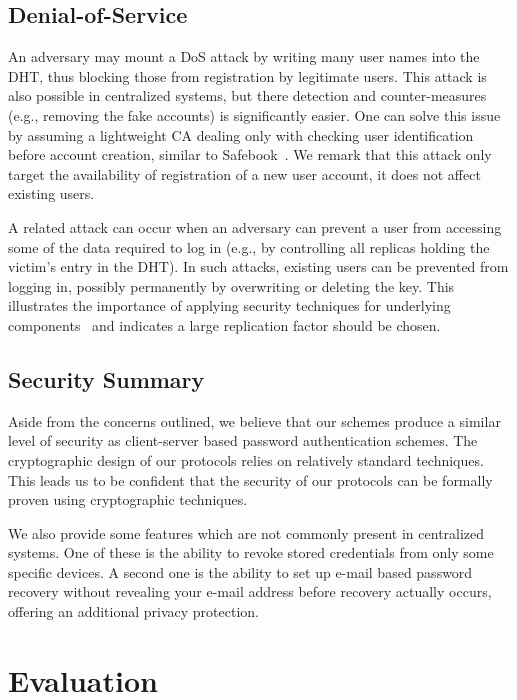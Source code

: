 \subsection{Denial-of-Service}

An adversary may mount a DoS attack by writing many user names into the DHT,
thus blocking those from registration by legitimate users. This attack is also
possible in centralized systems, but there detection and counter-measures
(e.g., removing the fake accounts) is significantly easier. One can solve this
issue by assuming a lightweight CA dealing only with checking user
identification before account creation, similar to Safebook~\cite{Cutillo09a}.
We remark that this attack only target the availability of registration of a
new user account, it does not affect existing users.

A related attack can occur when an adversary can prevent a user from accessing
some of the data required to log in (e.g., by controlling all replicas holding
the victim's entry in the DHT). In such attacks, existing users can be
prevented from logging in, possibly permanently by overwriting or deleting the
key. This illustrates the importance of applying security techniques for
underlying components~\cite{UrdanetaPS11} and indicates a large replication
factor should be chosen.

\subsection{Security Summary}

Aside from the concerns outlined, we believe that our schemes produce a
similar level of security as client-server based password authentication
schemes. The cryptographic design of our protocols relies on
relatively standard techniques. This leads us to be confident that the
security of our protocols can be formally proven using cryptographic
techniques.

We also provide some features which are not commonly present in centralized
systems. One of these is the ability to revoke stored credentials from only
some specific devices. A second one is the ability to set up e-mail based
password recovery without revealing your e-mail address before recovery
actually occurs, offering an additional privacy protection.

\section{Evaluation} 

